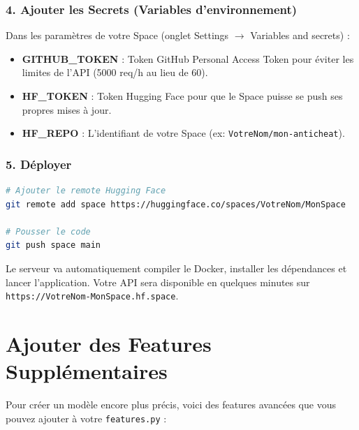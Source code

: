 \documentclass[a4paper,11pt]{article}
\begin{document}
\subsubsection{4. Ajouter les Secrets (Variables d'environnement)}
Dans les paramètres de votre Space (onglet Settings $\rightarrow$ Variables and secrets) :
\begin{itemize}
    \item \textbf{GITHUB\_TOKEN} : Token GitHub Personal Access Token pour éviter les limites de l'API (5000 req/h au lieu de 60).
    \item \textbf{HF\_TOKEN} : Token Hugging Face pour que le Space puisse se push ses propres mises à jour.
    \item \textbf{HF\_REPO} : L'identifiant de votre Space (ex: \texttt{VotreNom/mon-anticheat}).
\end{itemize}

\subsubsection{5. Déployer}
\begin{lstlisting}[language=bash]
# Ajouter le remote Hugging Face
git remote add space https://huggingface.co/spaces/VotreNom/MonSpace

# Pousser le code
git push space main
\end{lstlisting}

Le serveur va automatiquement compiler le Docker, installer les dépendances et lancer l'application. Votre API sera disponible en quelques minutes sur \texttt{https://VotreNom-MonSpace.hf.space}.


\section{Ajouter des Features Supplémentaires}

Pour créer un modèle encore plus précis, voici des features avancées que vous pouvez ajouter à votre \texttt{features.py} :
\end{document}
